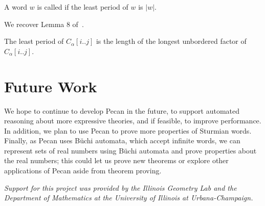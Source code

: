 \documentclass[a4paper,usenames,dvipsnames]{article}
\begin{document}
\begin{definition}
    A word $w$ is called  if the least period of $w$ is $|w|$.
\end{definition}
We recover Lemma 8 of~\cite{Currie2009LeastPO}.
\begin{theorem}
    The least period of $C_{\alpha}[i..j]$ is the length of the longest unbordered factor of $C_{\alpha}[i..j]$.
\end{theorem}

\section{Future Work}

We hope to continue to develop Pecan in the future, to support automated reasoning about more expressive theories, and if feasible, to improve performance.
In addition, we plan to use Pecan to prove more properties of Sturmian words.
Finally, as Pecan uses B\"uchi automata, which accept infinite words, we can represent sets of real numbers using B\"uchi automata and prove properties about the real numbers; this could let us prove new theorems or explore other applications of Pecan aside from theorem proving.

\vspace*{10mm} %
\emph{
Support for this project was provided by the Illinois Geometry Lab and the Department of Mathematics at the University of Illinois at Urbana-Champaign.
}

\printbibliography
\end{document}
